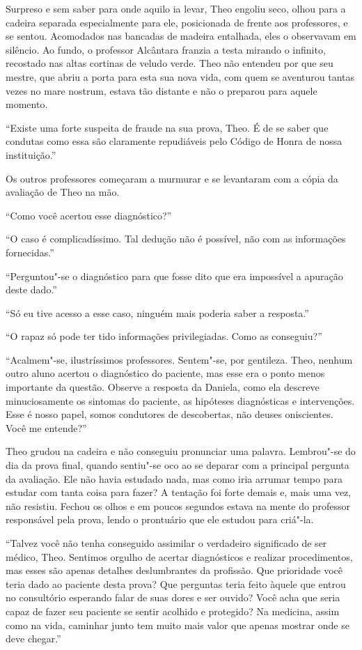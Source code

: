Surpreso e sem saber para onde aquilo ia levar, Theo engoliu seco, olhou
para a cadeira separada especialmente para ele, posicionada de frente
aos professores, e se sentou. Acomodados nas bancadas de madeira
entalhada, eles o observavam em silêncio. Ao fundo, o professor
Alcântara franzia a testa mirando o infinito, recostado nas altas
cortinas de veludo verde. Theo não entendeu por que seu mestre, que abriu
a porta para esta sua nova vida, com quem se aventurou tantas vezes no mare
nostrum, estava tão distante e não o preparou para aquele momento.

``Existe uma forte suspeita de fraude na sua prova, Theo. É de se saber
que condutas como essa são claramente repudiáveis pelo Código de Honra
de nossa instituição.''

Os outros professores começaram a murmurar e se levantaram com a cópia
da avaliação de Theo na mão.

``Como você acertou esse diagnóstico?''

``O caso é complicadíssimo. Tal dedução não é possível, não com as
informações fornecidas.''

``Perguntou"-se o diagnóstico para que fosse dito que era impossível a
apuração deste dado.''

``Só eu tive acesso a esse caso, ninguém mais poderia saber a
resposta.''

``O rapaz só pode ter tido informações privilegiadas. Como as
conseguiu?''

``Acalmem"-se, ilustríssimos professores. Sentem"-se, por gentileza. Theo,
nenhum outro aluno acertou o diagnóstico do paciente, mas esse era o
ponto menos importante da questão. Observe a resposta da Daniela, como
ela descreve minuciosamente os sintomas do paciente, as hipóteses
diagnósticas e intervenções. Esse é nosso papel, somos condutores de
descobertas, não deuses oniscientes. Você me entende?''

Theo grudou na cadeira e não conseguiu pronunciar uma palavra.
Lembrou"-se do dia da prova final, quando sentiu"-se oco ao se deparar
com a principal pergunta da avaliação. Ele não havia estudado nada,
mas como iria arrumar tempo para estudar com tanta coisa para fazer?
A tentação foi forte demais e, mais uma vez, não resistiu. Fechou os
olhos e em poucos segundos estava na mente do professor responsável pela
prova, lendo o prontuário que ele estudou para criá"-la.

``Talvez você não tenha conseguido assimilar o verdadeiro significado de
ser médico, Theo. Sentimos orgulho de acertar diagnósticos e realizar
procedimentos, mas esses são apenas detalhes deslumbrantes da profissão.
Que prioridade você teria dado ao paciente desta prova? Que perguntas
teria feito àquele que entrou no consultório esperando falar de suas
dores e ser ouvido? Você acha que seria capaz de fazer seu paciente se
sentir acolhido e protegido? Na medicina, assim como na vida, caminhar
junto tem muito mais valor que apenas mostrar onde se deve chegar.''

